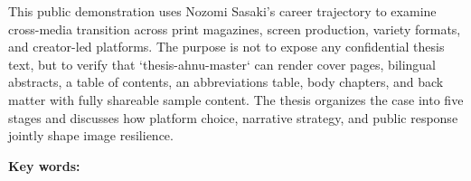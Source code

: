 
This public demonstration uses Nozomi Sasaki's career trajectory to examine cross-media transition across print magazines, screen production, variety formats, and creator-led platforms. The purpose is not to expose any confidential thesis text, but to verify that `thesis-ahnu-master` can render cover pages, bilingual abstracts, a table of contents, an abbreviations table, body chapters, and back matter with fully shareable sample content. The thesis organizes the case into five stages and discusses how platform choice, narrative strategy, and public response jointly shape image resilience.

\vspace{1.2cm}
\noindent\textbf{Key words:}\ahnuKeywordsEn
